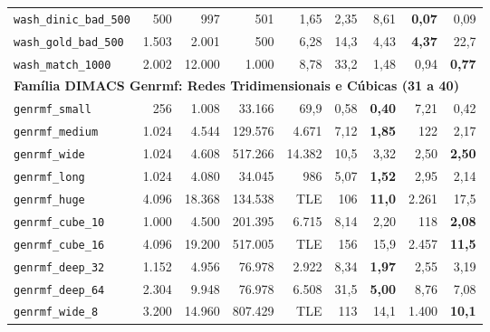 \begin{longtable}{lrrrrrrrr}
\texttt{wash\_dinic\_bad\_500} & 500 & 997 & 501 & 1,65 & 2,35 & 8,61 & \textbf{0,07} & 0,09 \\
\texttt{wash\_gold\_bad\_500} & 1.503 & 2.001 & 500 & 6,28 & 14,3 & 4,43 & \textbf{4,37} & 22,7 \\
\texttt{wash\_match\_1000} & 2.002 & 12.000 & 1.000 & 8,78 & 33,2 & 1,48 & 0,94 & \textbf{0,77} \\
\midrule
\multicolumn{9}{l}{\textbf{Família DIMACS Genrmf: Redes Tridimensionais e Cúbicas (31 a 40)}} \\
\midrule
\texttt{genrmf\_small} & 256 & 1.008 & 33.166 & 69,9 & 0,58 & \textbf{0,40} & 7,21 & 0,42 \\
\texttt{genrmf\_medium} & 1.024 & 4.544 & 129.576 & 4.671 & 7,12 & \textbf{1,85} & 122 & 2,17 \\
\texttt{genrmf\_wide} & 1.024 & 4.608 & 517.266 & 14.382 & 10,5 & 3,32 & 2,50 & \textbf{2,50} \\
\texttt{genrmf\_long} & 1.024 & 4.080 & 34.045 & 986 & 5,07 & \textbf{1,52} & 2,95 & 2,14 \\
\texttt{genrmf\_huge} & 4.096 & 18.368 & 134.538 & TLE & 106 & \textbf{11,0} & 2.261 & 17,5 \\
\texttt{genrmf\_cube\_10} & 1.000 & 4.500 & 201.395 & 6.715 & 8,14 & 2,20 & 118 & \textbf{2,08} \\
\texttt{genrmf\_cube\_16} & 4.096 & 19.200 & 517.005 & TLE & 156 & 15,9 & 2.457 & \textbf{11,5} \\
\texttt{genrmf\_deep\_32} & 1.152 & 4.956 & 76.978 & 2.922 & 8,34 & \textbf{1,97} & 2,55 & 3,19 \\
\texttt{genrmf\_deep\_64} & 2.304 & 9.948 & 76.978 & 6.508 & 31,5 & \textbf{5,00} & 8,76 & 7,08 \\
\texttt{genrmf\_wide\_8} & 3.200 & 14.960 & 807.429 & TLE & 113 & 14,1 & 1.400 & \textbf{10,1} \\
\bottomrule
\end{longtable}
\endgroup

